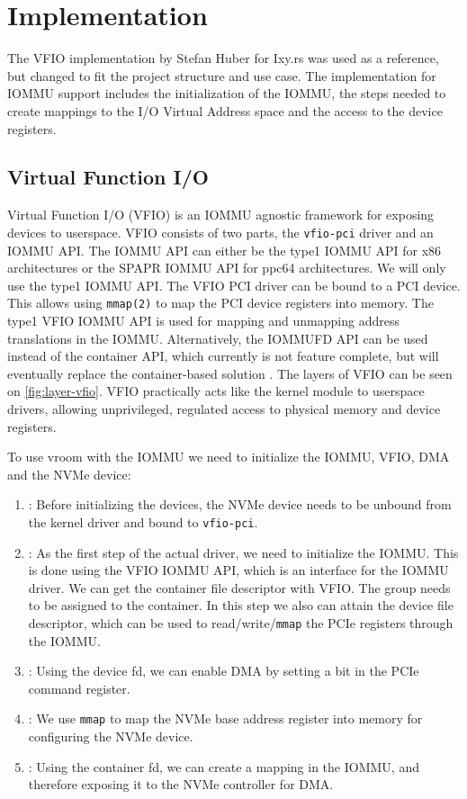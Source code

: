 \chapter{Implementation} \label{c:impl}

The VFIO implementation by Stefan Huber for Ixy.rs was used as a reference, but changed to fit the project structure and use case. The implementation for IOMMU support includes the initialization of the IOMMU, the steps needed to create mappings to the I/O Virtual Address space and the access to the device registers.

\section{Virtual Function I/O}
Virtual Function I/O (VFIO) is an IOMMU agnostic framework for exposing devices to userspace. VFIO consists of two parts, the \texttt{vfio-pci} driver and an IOMMU API. The IOMMU API can either be the type1 IOMMU API for x86 architectures or the SPAPR IOMMU API for ppc64 architectures. We will only use the type1 IOMMU API. The VFIO PCI driver can be bound to a PCI device. This allows using \texttt{mmap(2)} to map the PCI device registers into memory. The type1 VFIO IOMMU API is used for mapping and unmapping address translations in the IOMMU. Alternatively, the IOMMUFD API can be used instead of the container API, which currently is not feature complete, but will eventually replace the container-based solution \cite{vfiokerneldocs}. The layers of VFIO can be seen on \autoref{fig:layer-vfio}. VFIO practically acts like the kernel module to userspace drivers, allowing unprivileged, regulated access to physical memory and device registers.

To use vroom with the IOMMU we need to initialize the IOMMU, VFIO, DMA and the NVMe device:
\begin{enumerate}
    \item \textbf{}: Before initializing the devices, the NVMe device needs to be unbound from the kernel driver and bound to \texttt{vfio-pci}.
    \item \textbf{}: As the first step of the actual driver, we need to initialize the IOMMU. This is done using the VFIO IOMMU API, which is an interface for the IOMMU driver. We can get the container file descriptor with VFIO. The group needs to be assigned to the container. In this step we also can attain the device file descriptor, which can be used to read/write/\texttt{mmap} the PCIe registers through the IOMMU.
    \item \textbf{}: Using the device fd, we can enable DMA by setting a bit in the PCIe command register.
    \item \textbf{}: We use \texttt{mmap} to map the NVMe base address register into memory for configuring the NVMe device.
    \item \textbf{}: Using the container fd, we can create a mapping in the IOMMU, and therefore exposing it to the NVMe controller for DMA.
\end{enumerate}

